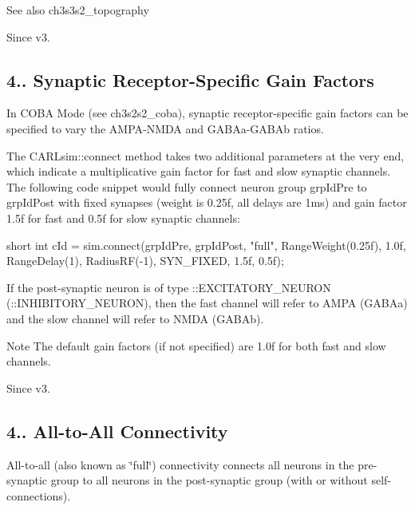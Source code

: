  \begin{DoxySeeAlso}{See also}
ch3s3s2\+\_\+topography 
\end{DoxySeeAlso}
\begin{DoxySince}{Since}
v3.
\end{DoxySince}
\hypertarget{ch4_connections_ch4s1s4_receptor_gain}{}\subsection{4.. Synaptic Receptor-\/\+Specific Gain Factors}\label{ch4_connections_ch4s1s4_receptor_gain}
In C\+O\+BA Mode (see ch3s2s2\+\_\+coba), synaptic receptor-\/specific gain factors can be specified to vary the A\+M\+P\+A-\/\+N\+M\+DA and G\+A\+B\+Aa-\/\+G\+A\+B\+Ab ratios.

The C\+A\+R\+Lsim\+::connect method takes two additional parameters at the very end, which indicate a multiplicative gain factor for fast and slow synaptic channels. The following code snippet would fully connect neuron group {\ttfamily grp\+Id\+Pre} to {\ttfamily grp\+Id\+Post} with fixed synapses (weight is 0.\+25f, all delays are 1ms) and gain factor 1.\+5f for fast and 0.\+5f for slow synaptic channels\+: 
\begin{DoxyCode}
\textcolor{keywordtype}{short} \textcolor{keywordtype}{int} cId = sim.connect(grpIdPre, grpIdPost, \textcolor{stringliteral}{"full"}, RangeWeight(0.25f), 1.0f, RangeDelay(1),
    RadiusRF(-1), SYN\_FIXED, 1.5f, 0.5f);
\end{DoxyCode}


If the post-\/synaptic neuron is of type \+::\+E\+X\+C\+I\+T\+A\+T\+O\+R\+Y\+\_\+\+N\+E\+U\+R\+ON (\+::\+I\+N\+H\+I\+B\+I\+T\+O\+R\+Y\+\_\+\+N\+E\+U\+R\+ON), then the fast channel will refer to A\+M\+PA (G\+A\+B\+Aa) and the slow channel will refer to N\+M\+DA (G\+A\+B\+Ab).

\begin{DoxyNote}{Note}
The default gain factors (if not specified) are 1.\+0f for both fast and slow channels. 
\end{DoxyNote}
\begin{DoxySince}{Since}
v3.
\end{DoxySince}
\hypertarget{ch4_connections_ch4s1s5_full}{}\subsection{4.. All-\/to-\/\+All Connectivity}\label{ch4_connections_ch4s1s5_full}
All-\/to-\/all (also known as \char`\"{}full\char`\"{}) connectivity connects all neurons in the pre-\/synaptic group to all neurons in the post-\/synaptic group (with or without self-\/connections).

